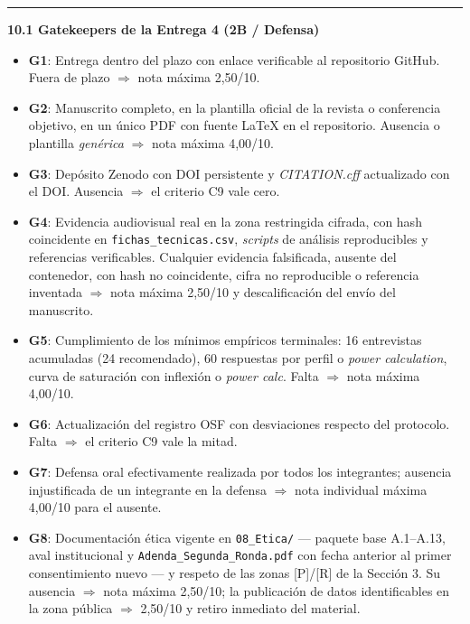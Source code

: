 \documentclass[11pt,a4paper]{article}
\newcommand{\submark}[1]{\par\vspace{4pt}\noindent
    {\color{uteqgreen}\rule[-1pt]{3.5pt}{12pt}}\hspace{6pt}\textbf{\color{uteqgreen}#1}\par\vspace{2pt}}
\begin{document}
\submark{10.1 Gatekeepers de la Entrega 4 (2B / Defensa)}
\begin{itemize}
    \item \textbf{G1}: Entrega dentro del plazo con enlace verificable al repositorio GitHub. Fuera de plazo $\Rightarrow$ nota máxima 2,50/10.
    \item \textbf{G2}: Manuscrito completo, en la plantilla oficial de la revista o conferencia objetivo, en un único PDF con fuente LaTeX en el repositorio. Ausencia o plantilla \emph{genérica} $\Rightarrow$ nota máxima 4,00/10.
    \item \textbf{G3}: Depósito Zenodo con DOI persistente y \emph{CITATION.cff} actualizado con el DOI. Ausencia $\Rightarrow$ el criterio C9 vale cero.
    \item \textbf{G4}: Evidencia audiovisual real en la zona restringida cifrada, con hash coincidente en \texttt{fichas\_tecnicas.csv}, \emph{scripts} de análisis reproducibles y referencias verificables. Cualquier evidencia falsificada, ausente del contenedor, con hash no coincidente, cifra no reproducible o referencia inventada $\Rightarrow$ nota máxima 2,50/10 y descalificación del envío del manuscrito.
    \item \textbf{G5}: Cumplimiento de los mínimos empíricos terminales: 16 entrevistas acumuladas (24 recomendado), 60 respuestas por perfil o \emph{power calculation}, curva de saturación con inflexión o \emph{power calc}. Falta $\Rightarrow$ nota máxima 4,00/10.
    \item \textbf{G6}: Actualización del registro OSF con desviaciones respecto del protocolo. Falta $\Rightarrow$ el criterio C9 vale la mitad.
    \item \textbf{G7}: Defensa oral efectivamente realizada por todos los integrantes; ausencia injustificada de un integrante en la defensa $\Rightarrow$ nota individual máxima 4,00/10 para el ausente.
    \item \textbf{G8}: Documentación ética vigente en \texttt{08\_Etica/} --- paquete base A.1--A.13, aval institucional y \texttt{Adenda\_Segunda\_Ronda.pdf} con fecha anterior al primer consentimiento nuevo --- y respeto de las zonas [P]/[R] de la Sección 3. Su ausencia $\Rightarrow$ nota máxima 2,50/10; la publicación de datos identificables en la zona pública $\Rightarrow$ 2,50/10 y retiro inmediato del material.
\end{itemize}
\end{document}
